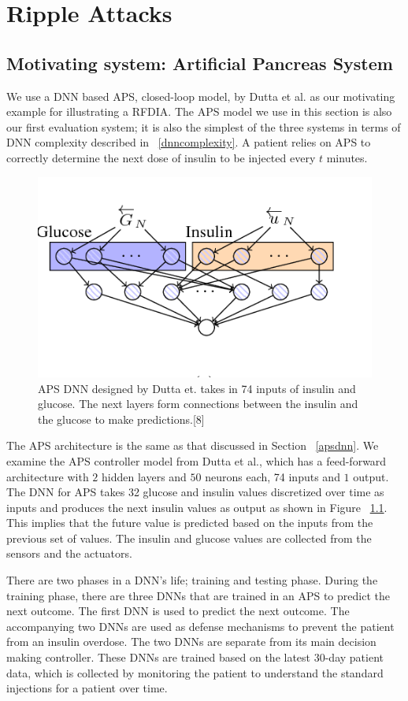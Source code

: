 \chapter{Ripple Attacks}
\label{attack}

\section{Motivating system: Artificial Pancreas System}
\label{aps}

We use a DNN based \ac{APS}, closed-loop model, by Dutta et al. \cite{10.1007/978-3-319-99429-1_11}  as our motivating example for illustrating a \ac{RFDIA}. 
The \ac{APS} model we use in this section is also our first evaluation system; it is also the simplest of the three systems in terms of \ac{DNN} complexity described in ~\ref{dnncomplexity}.
A patient relies on  \ac{APS} to correctly determine the next dose of insulin to be injected every $t$ minutes. 

\begin{figure}
	\centering
	\includegraphics[width=0.7\linewidth, height=0.3\linewidth]{Images/APSDNN}
	\caption[APS DNN]{APS DNN designed by Dutta et. takes in 74 inputs of insulin and glucose. The next layers form connections between the insulin and the glucose to make predictions.[8]}
	\label{fig:apsdnn}
\end{figure}

The APS architecture is  the same as that discussed in Section ~\ref{apsdnn}. 
We examine the \ac{APS} controller model from Dutta et al., which has a feed-forward architecture with $2$ hidden layers and $50$ neurons each, 74 inputs and $1$ output. 
The DNN for APS takes 32 glucose and insulin values discretized over time as inputs and produces the next insulin values as output as shown in Figure ~\ref{fig:apsdnn}. 
 This implies that the future value is predicted based on the inputs from the previous set of values. 
The insulin and glucose values are collected from the sensors and the actuators. 



There are two phases in a \ac{DNN}'s life; training and testing phase. 
During the training phase, there are three \ac{DNN}s that are trained in an \ac{APS} to predict the next outcome. 
The first \ac{DNN} is used to predict the next outcome. 
The accompanying two \ac{DNN}s are used as defense mechanisms to prevent the patient from an insulin overdose.  
The two \ac{DNN}s are separate from its main decision making controller. 
These \ac{DNN}s are trained based on the latest 30-day patient data, which is collected by monitoring the patient to understand the standard injections for a patient over time. 

